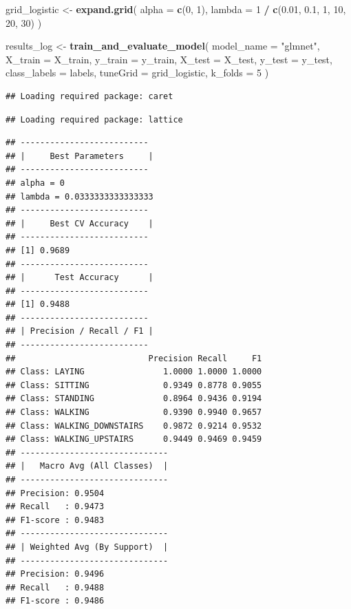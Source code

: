 \documentclass[
]{article}
\newenvironment{Shaded}{\begin{snugshade}}{\end{snugshade}}
\newcommand{\AttributeTok}[1]{\textcolor[rgb]{0.13,0.29,0.53}{#1}}
\newcommand{\DecValTok}[1]{\textcolor[rgb]{0.00,0.00,0.81}{#1}}
\newcommand{\FloatTok}[1]{\textcolor[rgb]{0.00,0.00,0.81}{#1}}
\newcommand{\FunctionTok}[1]{\textcolor[rgb]{0.13,0.29,0.53}{\textbf{#1}}}
\newcommand{\NormalTok}[1]{#1}
\newcommand{\OtherTok}[1]{\textcolor[rgb]{0.56,0.35,0.01}{#1}}
\newcommand{\SpecialCharTok}[1]{\textcolor[rgb]{0.81,0.36,0.00}{\textbf{#1}}}
\newcommand{\StringTok}[1]{\textcolor[rgb]{0.31,0.60,0.02}{#1}}
\begin{document}
\begin{Shaded}
\begin{Highlighting}[]
\NormalTok{grid\_logistic }\OtherTok{\textless{}{-}} \FunctionTok{expand.grid}\NormalTok{(}
  \AttributeTok{alpha =} \FunctionTok{c}\NormalTok{(}\DecValTok{0}\NormalTok{, }\DecValTok{1}\NormalTok{),}
  \AttributeTok{lambda =} \DecValTok{1} \SpecialCharTok{/} \FunctionTok{c}\NormalTok{(}\FloatTok{0.01}\NormalTok{, }\FloatTok{0.1}\NormalTok{, }\DecValTok{1}\NormalTok{, }\DecValTok{10}\NormalTok{, }\DecValTok{20}\NormalTok{, }\DecValTok{30}\NormalTok{)}
\NormalTok{)}

\NormalTok{results\_log }\OtherTok{\textless{}{-}} \FunctionTok{train\_and\_evaluate\_model}\NormalTok{(}
  \AttributeTok{model\_name =} \StringTok{"glmnet"}\NormalTok{,}
  \AttributeTok{X\_train =}\NormalTok{ X\_train,}
  \AttributeTok{y\_train =}\NormalTok{ y\_train,}
  \AttributeTok{X\_test =}\NormalTok{ X\_test, }
  \AttributeTok{y\_test =}\NormalTok{ y\_test,}
  \AttributeTok{class\_labels =}\NormalTok{ labels,}
  \AttributeTok{tuneGrid =}\NormalTok{ grid\_logistic,}
  \AttributeTok{k\_folds =} \DecValTok{5}
\NormalTok{)}
\end{Highlighting}
\end{Shaded}

\begin{verbatim}
## Loading required package: caret
\end{verbatim}

\begin{verbatim}
## Loading required package: lattice
\end{verbatim}

\begin{verbatim}
## --------------------------
## |     Best Parameters     |
## --------------------------
## alpha = 0
## lambda = 0.0333333333333333
## --------------------------
## |     Best CV Accuracy    |
## --------------------------
## [1] 0.9689
## --------------------------
## |      Test Accuracy      |
## --------------------------
## [1] 0.9488
## --------------------------
## | Precision / Recall / F1 |
## --------------------------
##                           Precision Recall     F1
## Class: LAYING                1.0000 1.0000 1.0000
## Class: SITTING               0.9349 0.8778 0.9055
## Class: STANDING              0.8964 0.9436 0.9194
## Class: WALKING               0.9390 0.9940 0.9657
## Class: WALKING_DOWNSTAIRS    0.9872 0.9214 0.9532
## Class: WALKING_UPSTAIRS      0.9449 0.9469 0.9459
## ------------------------------
## |   Macro Avg (All Classes)  |
## ------------------------------
## Precision: 0.9504
## Recall   : 0.9473
## F1-score : 0.9483
## ------------------------------
## | Weighted Avg (By Support)  |
## ------------------------------
## Precision: 0.9496
## Recall   : 0.9488
## F1-score : 0.9486
\end{verbatim}
\end{document}
